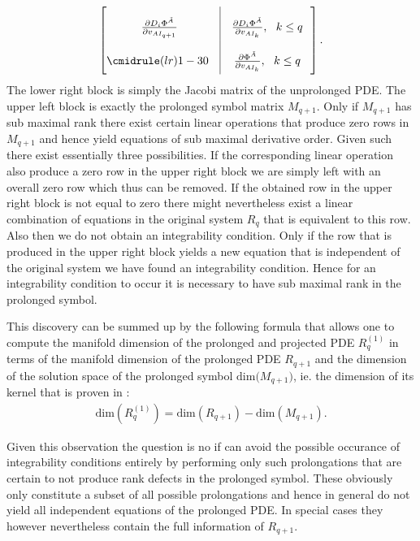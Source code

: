 \documentclass[a4paper,12pt, DIV=14, BCOR=5mm, twoside, headsepline, numbers=noenddot]{scrbook}
\begin{document}
\begin{align}
\def\arraystretch{2.5}
\begin{bmatrix}
      \ \ \frac{\partial D_i\Phi^{\tilde{A}}}{\partial v_{AI_{q+1}}} \ & \vline & \frac{\partial D_i \Phi^{\tilde{A}}}{\partial v_{AI_k}}, \ \ k \leq q \ \  \\
        \cmidrule(lr){1-3}
        0 & \vline & \frac{\partial \Phi^{\tilde{A}}}{\partial v_{AI_k}}, \ \ k \leq q \ \
\end{bmatrix}.
\end{align}
The lower right block is simply the Jacobi matrix of the unprolonged PDE. The upper left block is exactly the prolonged symbol matrix $M_{q+1}$. Only if $M_{q+1}$ has sub maximal rank there exist certain linear operations that produce zero rows in $M_{q+1}$ and hence yield equations of sub maximal derivative order. Given such there exist essentially three possibilities. If the corresponding linear operation also produce a zero row in the upper right block we are simply left with an overall zero row which thus can be removed. If the obtained row in the upper right block is not equal to zero there might nevertheless exist a linear combination of equations in the original system $R_q$ that is equivalent to this row. Also then we do not obtain an integrability condition. Only if the row that is produced in the upper right block yields a new equation that is independent of the original system we have found an integrability condition.  
Hence for an integrability condition to occur it is necessary to have sub maximal rank in the prolonged symbol.

This discovery can be summed up by the following formula that allows one to compute the manifold dimension of the prolonged and projected PDE $R_q^{(1)}$ in terms of the manifold dimension of the prolonged PDE $R_{q+1}$ and the dimension of the solution space of the prolonged symbol $\mathrm{dim(}M_{q+1})$, ie. the dimension of its kernel that is proven in \cite{seiler1994analysis}:
\begin{align}
    \mathrm{dim}(R_{q}^{(1)}) = \mathrm{dim}(R_{q+1}) - \mathrm{dim}(M_{q+1}).
\end{align}

Given this observation the question is no if can avoid the possible occurance of integrability conditions entirely by performing only such prolongations that are certain to not produce rank defects in the prolonged symbol. These obviously only constitute a subset of all possible prolongations and hence in general do not yield all independent equations of the prolonged PDE. In special cases they however nevertheless contain the full information of $R_{q+1}$.
\end{document}
